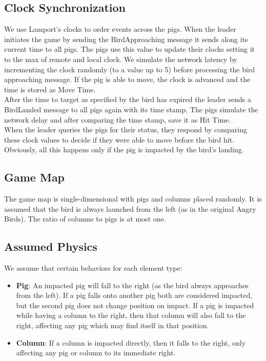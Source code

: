 \documentclass[]{article}
\begin{document}
\subsection{Clock Synchronization}
We use Lamport's clocks to order events across the pigs. When the leader initiates the game by sending the BirdApproaching 
message it sends along its current time to all pigs. The pigs use this value to update their clocks setting it to the max of remote 
and local clock. We simulate the network latency by incrementing the clock randomly (to a value up to 5) before processing the
bird approaching message. If the pig is able to move, the clock is advanced and the time is stored as Move Time. \\
After the time to target as specified by the bird has expired the leader sends a BirdLanded message to all pigs again with its time stamp. 
The pigs simulate the network delay and after comparing the time stamp, save it as Hit Time.\\
When the leader queries the pigs for their status, they respond by comparing these clock values to decide if they were able to move before the bird hit. 
Obviously, all this happens only if the pig is impacted by the bird's landing.  

\subsection{Game Map}

The game map is single-dimensional with pigs and columns placed
randomly. It is assumed that the bird is always launched from the left
(as in the original Angry Birds). The ratio of columns to pigs is at
most one.

\subsection{Assumed Physics}

We assume that certain behaviors for each element type:

\begin{itemize}
\item
  \textbf{Pig}: An impacted pig will fall to the right (as the bird
  always approaches from the left). If a pig falls onto another pig both
  are considered impacted, but the second pig does not change position
  on impact. If a pig is impacted while having a column to the right,
  then that column will also fall to the right, affecting any pig which
  may find itself in that position.
\item
  \textbf{Column}: If a column is impacted directly, then it falls to
  the right, only affecting any pig or column to its immediate right.
\end{itemize}
\end{document}
